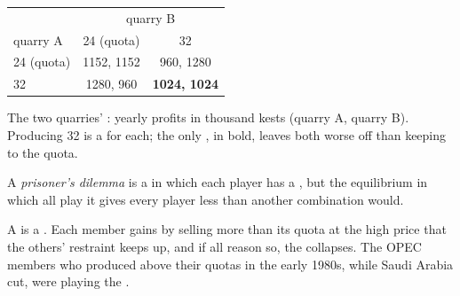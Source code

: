 \begin{omfigure}
\small
\begin{tabular}{l c c}
\toprule
& \multicolumn{2}{c}{quarry B} \\
quarry A & 24 (quota) & 32 \\
\midrule
24 (quota) & 1152, 1152 & 960, 1280 \\
32 & 1280, 960 & \textbf{1024, 1024} \\
\bottomrule
\end{tabular}

\medskip
{\small The two quarries' : yearly profits in thousand kests (quarry A, quarry B). Producing 32 is a  for each; the only , in bold,
leaves both worse off than keeping to the quota.}
\end{omfigure}

\begin{definition}\label{def:g11:oligopoly-and-games:prisoners-dilemma}
A \emph{prisoner's dilemma} is a  in which each player has a , but the equilibrium in which all play it gives every
player less than another combination would.
\end{definition}

A  is a . Each member gains by selling more than its quota at the high price that the others' restraint keeps up, and if all reason so,
the  collapses. The OPEC members who produced above their quotas in the early 1980s, while Saudi Arabia cut, were playing the .

